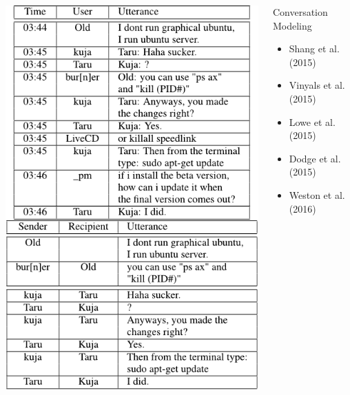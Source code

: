 \begin{frame}
    \begin{columns}            
        \begin{column}{0.6\textwidth}
            \begin{overlayarea}{\textwidth}{\textheight}
                \vspace{0.2in}
                \includegraphics[width=0.6\linewidth]{images/cm}
            \end{overlayarea}
        \end{column}
        \begin{column}{0.4\textwidth}
            \begin{overlayarea}{\textwidth}{\textheight}
                \begin{block}{Conversation Modeling}
                    \begin{itemize}
                        \item Shang et al. (2015)\cite{DBLP:conf/acl/ShangLL15}
                        \item Vinyals et al. (2015)\cite{DBLP:journals/corr/VinyalsL15}
                        \item Lowe et al. (2015)\cite{DBLP:conf/sigdial/LowePSP15}
                        \item Dodge et al. (2015)\cite{DBLP:journals/corr/DodgeGZBCMSW15}
                        \item Weston et al. (2016)\cite{DBLP:journals/corr/WestonBCM15}

\end{itemize}
\end{block}
\end{overlayarea}
\end{column}
\end{columns}
\end{frame}
